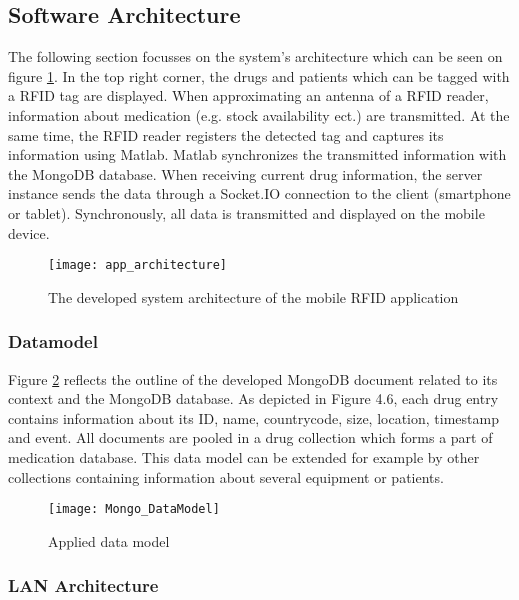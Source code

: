 \subsection{Software Architecture} \label{section_architecture}

The following section focusses on the system's architecture which can be seen on figure \ref{fig:apparchitecture}. In the top right corner, the drugs and patients which can be tagged with a RFID tag are displayed. When approximating an antenna of a RFID reader, information about medication (e.g. stock availability ect.) are transmitted. At the same time, the RFID reader registers the detected tag and captures its information using Matlab. Matlab synchronizes the transmitted information with the MongoDB database. When receiving current drug information, the server instance sends the data through a Socket.IO connection to the client (smartphone or tablet). Synchronously, all data is transmitted and displayed on the mobile device.

\begin{figure}
\centering
\texttt{[image: app\_architecture]} 
\caption{\label{fig:apparchitecture}The developed system architecture of the mobile RFID application} 
\end{figure}

\subsubsection{Datamodel}

Figure \ref{fig:datamodel} reflects the outline of the developed MongoDB document related to its context and the MongoDB database. As depicted in Figure 4.6, each drug entry contains information about its ID, name, countrycode, size, location, timestamp and event. All documents are pooled in a drug collection which forms a part of medication database. This data model can be extended for example by other collections containing information about several equipment or patients. 

\begin{figure}
\centering
\texttt{[image: Mongo\_DataModel]} 
\caption{\label{fig:datamodel}Applied data model} 
\end{figure}

\subsubsection{\ac{LAN} Architecture}

